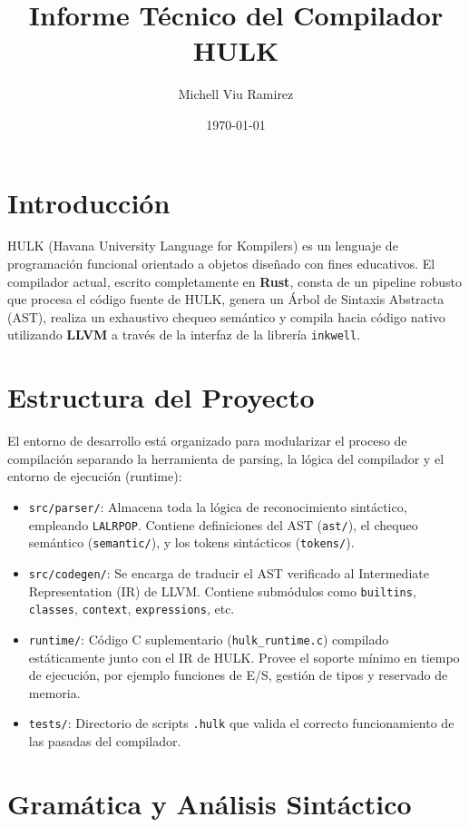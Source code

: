 \documentclass[11pt,a4paper]{article}
\title{\textbf{Informe Técnico del Compilador HULK}}
\author{Michell Viu Ramirez}
\date{\today}
\begin{document}
\maketitle
\tableofcontents
\newpage

\section{Introducción}
HULK (Havana University Language for Kompilers) es un lenguaje de programación funcional orientado a objetos diseñado con fines educativos. El compilador actual, escrito completamente en \textbf{Rust}, consta de un pipeline robusto que procesa el código fuente de HULK, genera un Árbol de Sintaxis Abstracta (AST), realiza un exhaustivo chequeo semántico y compila hacia código nativo utilizando \textbf{LLVM} a través de la interfaz de la librería \texttt{inkwell}.

\section{Estructura del Proyecto}
El entorno de desarrollo está organizado para modularizar el proceso de compilación separando la herramienta de parsing, la lógica del compilador y el entorno de ejecución (runtime):

\begin{itemize}
    \item \texttt{src/parser/}: Almacena toda la lógica de reconocimiento sintáctico, empleando \texttt{LALRPOP}. Contiene definiciones del AST (\texttt{ast/}), el chequeo semántico (\texttt{semantic/}), y los tokens sintácticos (\texttt{tokens/}).
    \item \texttt{src/codegen/}: Se encarga de traducir el AST verificado al Intermediate Representation (IR) de LLVM. Contiene submódulos como \texttt{builtins}, \texttt{classes}, \texttt{context}, \texttt{expressions}, etc.
    \item \texttt{runtime/}: Código C suplementario (\texttt{hulk\_runtime.c}) compilado estáticamente junto con el IR de HULK. Provee el soporte mínimo en tiempo de ejecución, por ejemplo funciones de E/S, gestión de tipos y reservado de memoria.
    \item \texttt{tests/}: Directorio de scripts \texttt{.hulk} que valida el correcto funcionamiento de las pasadas del compilador.
\end{itemize}

\section{Gramática y Análisis Sintáctico}
\end{document}
